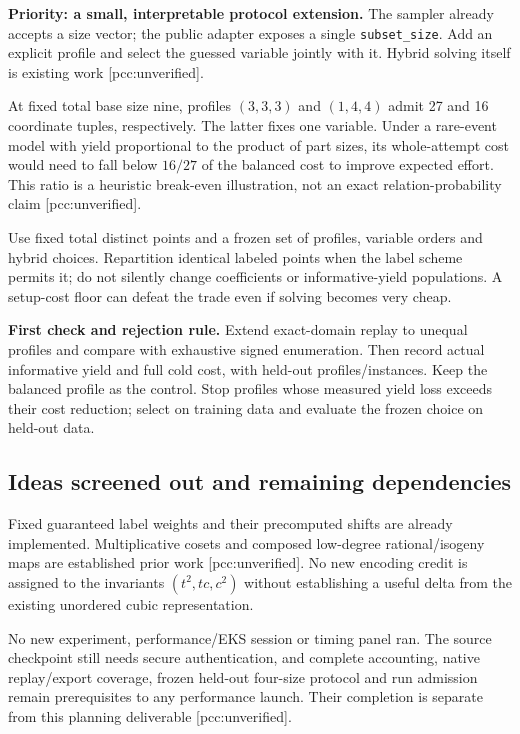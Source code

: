 \documentclass[
  10pt,
]{article}
\begin{document}
\textbf{Priority: a small, interpretable protocol extension.} The
sampler already accepts a size vector; the public adapter exposes a
single \texttt{subset\_size}. Add an explicit profile and select the
guessed variable jointly with it. Hybrid solving itself is existing work
{[}pcc:unverified{]}.

At fixed total base size nine, profiles \((3,3,3)\) and \((1,4,4)\)
admit 27 and 16 coordinate tuples, respectively. The latter fixes one
variable. Under a rare-event model with yield proportional to the
product of part sizes, its whole-attempt cost would need to fall below
\(16/27\) of the balanced cost to improve expected effort. This ratio is
a heuristic break-even illustration, not an exact relation-probability
claim {[}pcc:unverified{]}.

Use fixed total distinct points and a frozen set of profiles, variable
orders and hybrid choices. Repartition identical labeled points when the
label scheme permits it; do not silently change coefficients or
informative-yield populations. A setup-cost floor can defeat the trade
even if solving becomes very cheap.

\textbf{First check and rejection rule.} Extend exact-domain replay to
unequal profiles and compare with exhaustive signed enumeration. Then
record actual informative yield and full cold cost, with held-out
profiles/instances. Keep the balanced profile as the control. Stop
profiles whose measured yield loss exceeds their cost reduction; select
on training data and evaluate the frozen choice on held-out data.

\subsection{Ideas screened out and remaining
dependencies}\label{ideas-screened-out-and-remaining-dependencies}

Fixed guaranteed label weights and their precomputed shifts are already
implemented. Multiplicative cosets and composed low-degree
rational/isogeny maps are established prior work {[}pcc:unverified{]}.
No new encoding credit is assigned to the invariants \((t^2,tc,c^2)\)
without establishing a useful delta from the existing unordered cubic
representation.

No new experiment, performance/EKS session or timing panel ran. The
source checkpoint still needs secure authentication, and complete
accounting, native replay/export coverage, frozen held-out four-size
protocol and run admission remain prerequisites to any performance
launch. Their completion is separate from this planning deliverable
{[}pcc:unverified{]}.
\end{document}
